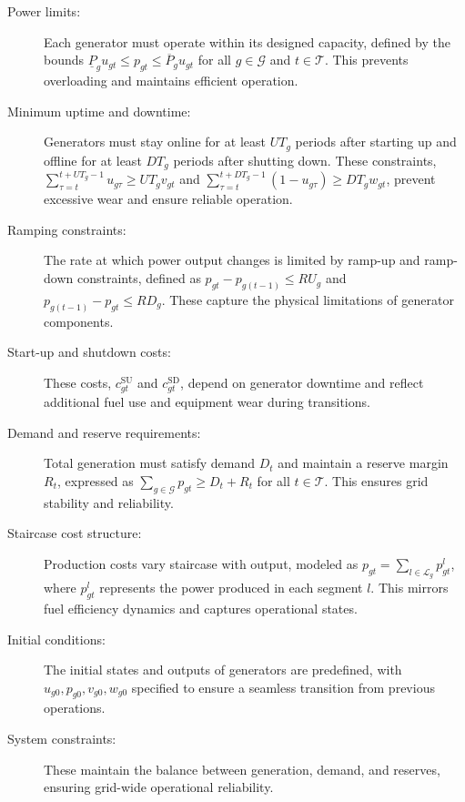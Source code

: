 \begin{description}
    \item[Power limits:] Each generator must operate within its designed capacity, defined by the bounds $\underline{P}_g u_{gt} \leq p_{gt} \leq \overline{P}_g u_{gt}$ for all $g \in \mathcal{G}$ and $t \in \mathcal{T}$. This prevents overloading and maintains efficient operation.

\item[Minimum uptime and downtime:] Generators must stay online for at least $UT_g$ periods after starting up and offline for at least $DT_g$ periods after shutting down. These constraints, $\sum_{\tau=t}^{t+UT_g-1} u_{g\tau} \geq UT_g v_{gt}$ and $\sum_{\tau=t}^{t+DT_g-1} (1 - u_{g\tau}) \geq DT_g w_{gt}$, prevent excessive wear and ensure reliable operation.

\item[Ramping constraints:] The rate at which power output changes is limited by ramp-up and ramp-down constraints, defined as $p_{gt} - p_{g(t-1)} \leq RU_g$ and $p_{g(t-1)} - p_{gt} \leq RD_g$. These capture the physical limitations of generator components.

\item[Start-up and shutdown costs:] These costs, $c_{gt}^{\text{SU}}$ and $c_{gt}^{\text{SD}}$, depend on generator downtime and reflect additional fuel use and equipment wear during transitions.

\item[Demand and reserve requirements:] Total generation must satisfy demand $D_t$ and maintain a reserve margin $R_t$, expressed as $\sum_{g \in \mathcal{G}} p_{gt} \geq D_t + R_t$ for all $t \in \mathcal{T}$. This ensures grid stability and reliability.

\item[Staircase cost structure:] Production costs vary staircase with output, modeled as $p_{gt} = \sum_{l \in \mathcal{L}_g} p_{gt}^l$, where $p_{gt}^l$ represents the power produced in each segment $l$. This mirrors fuel efficiency dynamics and captures operational states.

\item[Initial conditions:] The initial states and outputs of generators are predefined, with $u_{g0}, p_{g0}, v_{g0}, w_{g0}$ specified to ensure a seamless transition from previous operations.

\item[System constraints:] These maintain the balance between generation, demand, and reserves, ensuring grid-wide operational reliability.
\end{description}

